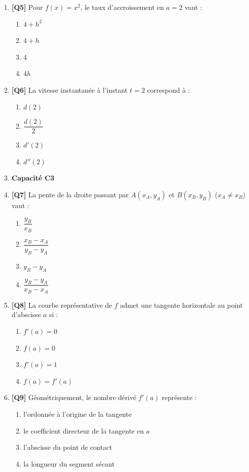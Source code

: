 \begin{enumerate}
\item \textbf{[Q5]} Pour $f(x) = x^2$, le taux d'accroissement en $a=2$ vaut :
  \begin{enumerate}[label=\Alph*.]
    \item $4 + h^2$
    \item $4 + h$
    \item $4$
    \item $4h$
  \end{enumerate}

\item \textbf{[Q6]} La vitesse instantanée à l'instant $t=2$ correspond à :
  \begin{enumerate}[label=\Alph*.]
    \item $d(2)$
    \item $\dfrac{d(2)}{2}$
    \item $d'(2)$
    \item $d''(2)$
  \end{enumerate}

\item[] \textbf{Capacité C3}

\item \textbf{[Q7]} La pente de la droite passant par $A(x_A, y_A)$ et $B(x_B, y_B)$ ($x_A \neq x_B$) vaut :
  \begin{enumerate}[label=\Alph*.]
    \item $\dfrac{y_B}{x_B}$
    \item $\dfrac{x_B - x_A}{y_B - y_A}$
    \item $y_B - y_A$
    \item $\dfrac{y_B - y_A}{x_B - x_A}$
  \end{enumerate}

\item \textbf{[Q8]} La courbe représentative de $f$ admet une tangente horizontale au point d'abscisse $a$ si :
  \begin{enumerate}[label=\Alph*.]
    \item $f'(a) = 0$
    \item $f(a) = 0$
    \item $f'(a) = 1$
    \item $f(a) = f'(a)$
  \end{enumerate}

\item \textbf{[Q9]} Géométriquement, le nombre dérivé $f'(a)$ représente :
  \begin{enumerate}[label=\Alph*.]
    \item l'ordonnée à l'origine de la tangente
    \item le coefficient directeur de la tangente en $a$
    \item l'abscisse du point de contact
    \item la longueur du segment sécant
  \end{enumerate}


\end{enumerate}
